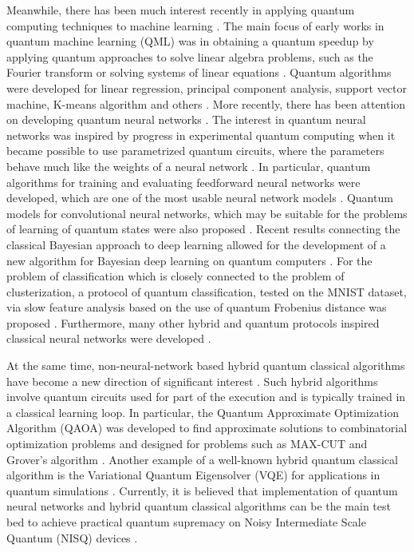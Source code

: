 \documentclass[pra,showkeys,twocolumn,showpacs]{revtex4-1}
\begin{document}
Meanwhile, there has been much interest recently in applying quantum computing techniques to machine learning \cite{dunjko2018, biamonte2017, schuld2014, carleo2019}.
The main focus of early works in quantum machine learning (QML) was in obtaining a quantum speedup \cite{biamonte2017, schuld2014} by applying quantum approaches to solve linear algebra problems, such as the Fourier transform or solving systems of linear equations \cite{wiebe2012,harrow2009,childs2017}.
Quantum algorithms were developed for  linear regression, principal component analysis, support vector machine, K-means algorithm and others \cite{lloyd2013,lloyd2014,dunjko2016,paparo2014,rebentrost2014}.
More recently, there has been attention on developing quantum neural networks \cite{kamruzzaman2019, schuld2014b, jeswal2019, broughton2020}.
The interest in quantum neural networks was inspired by progress in experimental quantum computing when it became possible to use parametrized quantum circuits,
where the parameters behave much like the weights of a neural network \cite{lewenstein1994}.
In particular, quantum algorithms for training and evaluating feedforward neural networks were developed,
which are one of the most usable neural network models \cite{allcock2018, tacchino2019}. Quantum models for convolutional neural networks, which may be suitable for the problems of learning of quantum states were also proposed \cite{cong2019, liu2019}. Recent results connecting the classical Bayesian approach to deep learning allowed for the development of a new algorithm for Bayesian deep learning on quantum computers \cite{zhao2019}. For the problem of classification which is closely connected to the problem of clusterization, a protocol of quantum classification, tested on the MNIST dataset, via slow feature analysis based on the use of quantum Frobenius distance was proposed \cite{kerenidis2018}. Furthermore, many other hybrid and quantum protocols inspired classical neural networks were developed  \cite{li2019, killoran2019, bondarenko2019, dunjko2017, nautrup2019, foesel2018, rebentrost2018, purushothaman1997, verdon2019, cherny2019, byrnes2013, mishra2019, pyrkov2019, vinci2019, lu2019}.

At the same time, non-neural-network based hybrid quantum classical algorithms have become a new direction of significant interest \cite{mcclean2016,arute2020,akshay2020}.
Such hybrid algorithms involve quantum circuits used for part of the execution and is typically trained in a classical learning loop.
In particular, the Quantum Approximate Optimization Algorithm (QAOA) was developed to find approximate solutions to combinatorial optimization problems \cite{farhi2014,farhi2016}
and designed for problems such as MAX-CUT and Grover's algorithm \cite{arute2020,akshay2020,wang2018,jiang2017,huang2019,wecker2016,pagano2019,byrnes2018}.
Another example of a well-known hybrid quantum classical algorithm is the Variational Quantum Eigensolver (VQE) for applications in quantum simulations
\cite{kandala2017,aspuru-guzik2005,lanyon2010,peruzzo2014}.
Currently, it is believed that implementation of quantum neural networks and hybrid quantum classical algorithms can be the main test bed to achieve practical quantum supremacy on Noisy Intermediate Scale Quantum (NISQ) devices \cite{preskill2018}.
\end{document}
